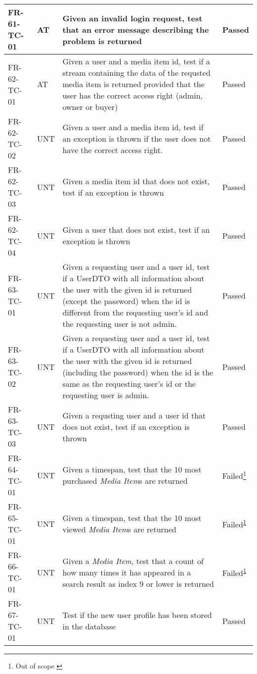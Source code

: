 \documentclass[../report.tex]{subfiles}
\newcommand{\footnoteref}[1]{\textsuperscript{\ref{#1}}}
\begin{document}
\begin{longtable}{|L{2.1cm}|L{1cm}|L{12.4cm}|L{1.4cm}|}
FR-61-TC-01&AT&Given an invalid login request, test that an error message describing the problem is returned&Passed  \\ \hline
FR-62-TC-01&AT&Given a user and a media item id, test if a stream containing the data of the requsted media item is returned provided that the user has the correct access right (admin, owner or buyer)&Passed  \\ \hline
FR-62-TC-02&UNT&Given a user and a media item id, test if an exception is thrown if the user does not have the correct access right.&Passed  \\ \hline
FR-62-TC-03&UNT&Given a media item id that does not exist, test if an exception is thrown&Passed  \\ \hline
FR-62-TC-04&UNT&Given a user that does not exist, test if an exception is thrown&Passed  \\ \hline
FR-63-TC-01&UNT&Given a requesting user and a user id, test if a UserDTO with all information about the user with the given id is returned (except the password) when the id is different from the requesting user's id and the requesting user is not admin.&Passed  \\ \hline
FR-63-TC-02&UNT&Given a requesting user and a user id, test if a UserDTO with all information about the user with the given id is returned (including the password) when the id is the same as the requesting user's id or the requesting user is admin.&Passed  \\ \hline
FR-63-TC-03&UNT&Given a requsting user and a user id that does not exist, test if an exception is thrown&Passed  \\ \hline
FR-64-TC-01 & UNT & Given a timespan, test that the 10 most purchased \textit{Media Item}s are returned & Failed\footnote{Out of scope \label{note2}}  \\ \hline
FR-65-TC-01 & UNT & Given a timespan, test that the 10 most viewed \textit{Media Item}s are returned & Failed\footnoteref{note2}  \\ \hline
FR-66-TC-01 & UNT & Given a \textit{Media Item}, test that a count of how many times it has appeared in a search result as index 9 or lower is returned & Failed\footnoteref{note2}  \\ \hline
FR-67-TC-01&UNT&Test if the new user profile has been stored in the database&Passed  \\ \hline

\end{longtable}
\end{document}
